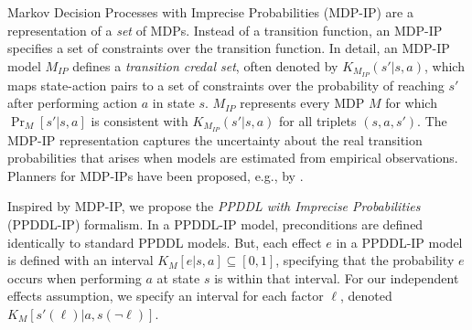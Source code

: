 \documentclass[letterpaper]{article} %
\newcommand{\tuple}[1]{\ensuremath{\left \langle #1 \right \rangle }}
\newcommand{\ip}{\textit{IP}}
\begin{document}
Markov Decision Processes with Imprecise Probabilities (MDP-IP) \cite{satia1973markovian}
are a representation of a \emph{set} of MDPs. 
Instead of a transition function, an MDP-IP specifies a set of constraints over the transition function. 
In detail, an MDP-IP model $M_{\ip}$ defines a \emph{transition credal set}, often denoted by $K_{M_{\ip}}(s'|s,a)$, which maps state-action pairs to a set of constraints over the probability of reaching $s'$ after performing action $a$ in state $s$. 
$M_{\ip}$ represents every MDP $M$ for which $\Pr_{M}[s'|s,a]$ is consistent with $K_{M_{\ip}}(s'|s,a)$ for all triplets $(s,a,s')$. %
The MDP-IP representation captures the uncertainty about the real transition probabilities that arises when models are estimated from empirical observations.
Planners for MDP-IPs have been proposed, e.g., by \citet{delgado2011efficient}.


Inspired by MDP-IP, we propose the \emph{PPDDL with Imprecise Probabilities} (PPDDL-IP) formalism. 
In a PPDDL-IP model, preconditions are defined identically to standard PPDDL models. 
But, each effect $e$ in a PPDDL-IP model is defined with an interval $K_M[e|s,a]\subseteq [0,1]$, specifying that the probability $e$ occurs when performing $a$ at state $s$ is within that interval. 
For our independent effects assumption, we specify an interval for each factor $\ell$, denoted $K_M[s'(\ell)|a,s(\neg \ell)]$.  

\end{document}
